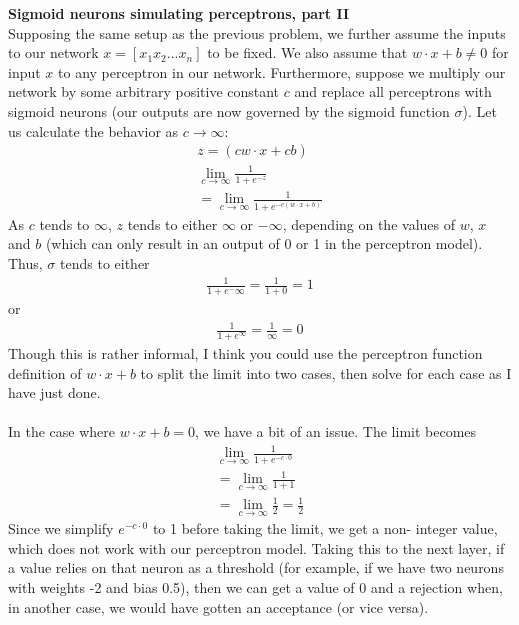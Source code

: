 \documentclass[12pt]{article}
\begin{document}
\newpage
\noindent
\textbf{Sigmoid neurons simulating perceptrons, part II} \\
Supposing the same setup as the previous problem, we further assume the inputs
to our network $x = [x_1x_2...x_n]$ to be fixed. We also assume that $w \cdot x
+ b \neq 0$ for input $x$ to any perceptron in our network. Furthermore, suppose
we multiply our network by some arbitrary positive constant $c$ and replace all
perceptrons with sigmoid neurons (our outputs are now governed by the sigmoid
function $\sigma$). Let us calculate the behavior as $c \rightarrow \infty$:
\begin{gather*}
    z = (cw \cdot x + cb) \\
    \lim_{c \to \infty} \frac{1}{1 + e^{-z}} \\
    = \lim_{c \to \infty} \frac{1}{1 + e^{-c(w \cdot x + b)}}
\end{gather*}
As $c$ tends to $\infty$, $z$ tends to either $\infty$ or $-\infty$, depending
on the values of $w$, $x$ and $b$ (which can only result in an output of 0 or 1
in the perceptron model). Thus, $\sigma$ tends to either
\begin{gather*}
    \frac{1}{1+e^-\infty} = \frac{1}{1+0} = 1
\end{gather*}
or 
\begin{gather*}
    \frac{1}{1+e^\infty} = \frac{1}{\infty} = 0
\end{gather*}
Though this is rather informal, I think you could use the perceptron function
definition of $w \cdot x + b$ to split the limit into two cases, then solve for
each case as I have just done. \\ \\
In the case where $w \cdot x + b = 0$, we have a bit of an issue. The limit
becomes
\begin{gather*}
    \lim_{c \to \infty} \frac{1}{1 + e^{-c \cdot 0}} \\
    = \lim_{c \to \infty} \frac{1}{1 + 1} \\
    = \lim_{c \to \infty} \frac{1}{2}  = \frac{1}{2} 
\end{gather*}
Since we simplify $e^{-c \cdot 0}$ to 1 before taking the limit, we get a non-
integer value, which does not work with our perceptron model. Taking this to the
next layer, if a value relies on that neuron as a threshold (for example, if we have two neurons with weights -2 and bias 0.5), then we can get a value of 0 and a rejection when, in another case, we would have gotten an acceptance (or vice versa).
\end{document}
